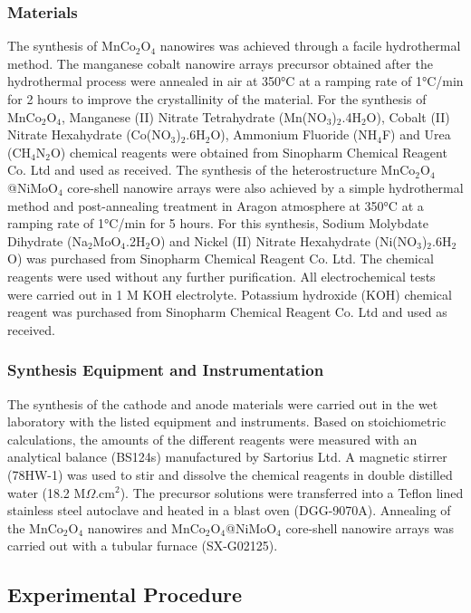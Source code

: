 \documentclass[reprint,amsmath,amssymb,aps,floatfix,
]{revtex4-2}
\begin{document}
\subsubsection{Materials}
The synthesis of MnCo$_2$O$_4$ nanowires was achieved through a facile hydrothermal method. The manganese cobalt nanowire arrays precursor obtained after the hydrothermal process were annealed in air at \ang{350}C at a ramping rate of \ang{1}C/min for 2 hours to improve the crystallinity of the material. For the synthesis of MnCo$_2$O$_4$, Manganese (II) Nitrate Tetrahydrate (Mn(NO$_3$)$_2$.4H$_2$O), Cobalt (II) Nitrate Hexahydrate (Co(NO$_3$)$_2$.6H$_2$O), Ammonium Fluoride (NH$_4$F) and Urea (CH$_4$N$_2$O) chemical reagents were obtained from Sinopharm Chemical Reagent Co. Ltd and used as received. The synthesis of the heterostructure MnCo$_2$O$_4$@NiMoO$_4$ core-shell nanowire arrays were also achieved by a simple hydrothermal method and post-annealing treatment in Aragon atmosphere at \ang{350}C at a ramping rate of \ang{1}C/min for 5 hours. For this synthesis, Sodium Molybdate Dihydrate (Na$_2$MoO$_4$.2H$_2$O) and Nickel (II) Nitrate Hexahydrate (Ni(NO$_3$)$_2$.6H$_2$O) was purchased from Sinopharm Chemical Reagent Co. Ltd. The chemical reagents were used without any further purification. All electrochemical tests were carried out in 1 M KOH electrolyte. Potassium hydroxide (KOH) chemical reagent was purchased from Sinopharm Chemical Reagent Co. Ltd and used as received.
\subsubsection{Synthesis Equipment and Instrumentation}
The synthesis of the cathode and anode materials were carried out in the wet laboratory with the listed equipment and instruments. Based on stoichiometric calculations, the amounts of the different reagents were measured with an analytical balance (BS124s) manufactured by Sartorius Ltd. A magnetic stirrer (78HW-1) was used to stir and dissolve the chemical reagents in double distilled water (18.2 M$\Omega$.cm$^2$). The precursor solutions were transferred into a Teflon lined stainless steel autoclave and heated in a blast oven (DGG-9070A). Annealing of the MnCo$_2$O$_4$ nanowires and MnCo$_2$O$_4$@NiMoO$_4$ core-shell nanowire arrays was carried out with a tubular furnace (SX-G02125).
\subsection{\label{sec:level3}Experimental Procedure}
\end{document}
